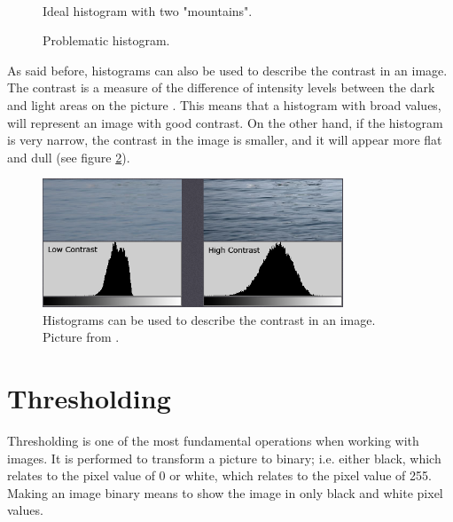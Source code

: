 \begin{figure}[htbp]
\begin{minipage}[b]{0.45\textwidth}
\end{minipage} \\ %
\begin{minipage}[t]{0.45\textwidth}
\caption{Ideal histogram with two "mountains".} %
\label{fig:SimpleThreshold}
\end{minipage} \hfill
\begin{minipage}[t]{0.45\textwidth}
\caption{Problematic histogram.} %
\label{fig:ComplicatedThreshold}
\end{minipage}
\end{figure}

As said before, histograms can also be used to describe the contrast in an image. The contrast is a measure of the difference of intensity levels between the dark and light areas on the picture \citep{histogram}. This means that a histogram with broad values, will represent an image with good contrast. On the other hand, if the histogram is very narrow, the contrast in the image is smaller, and it will appear more flat and dull (see figure \ref{fig:histogram_contrast}).

\begin{figure}[htbp]
\centering
\includegraphics[width=0.80\textwidth]{Pictures/Theory/hisogram_contrast.png}
\caption{Histograms can be used to describe the contrast in an image. Picture from \citep{histogram}.}
\label{fig:histogram_contrast}
\end{figure}

\section{Thresholding}\label{sec:Thresholding}
Thresholding is one of the most fundamental operations when working with images. It is performed to transform a picture to binary; i.e. either black, which relates to the pixel value of 0 or white, which relates to the pixel value of 255. Making an image binary means to show the image in only black and white pixel values.

